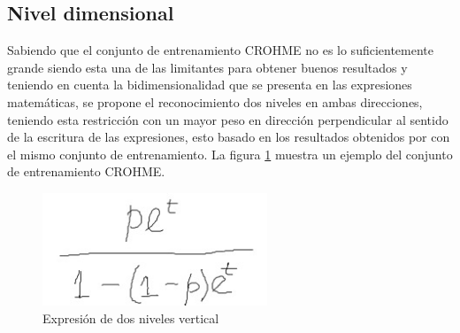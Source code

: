 \subsection{Nivel dimensional}
Sabiendo que el conjunto de entrenamiento CROHME no es lo suficientemente grande siendo esta una de las limitantes para obtener buenos resultados y teniendo en cuenta la bidimensionalidad que se presenta en las expresiones matemáticas, se propone el reconocimiento dos niveles en ambas direcciones, teniendo esta restricción con un mayor peso en dirección perpendicular al sentido de la escritura de las expresiones, esto basado en los resultados obtenidos por \cite{chino} 
con el mismo conjunto de entrenamiento. La figura \ref{fig:TwoDimensions} muestra un ejemplo del conjunto de entrenamiento CROHME.
\begin{figure}[H]
	\centering
	\includegraphics[width=0.6\textwidth]{capitulo3/imgs/twolevel.jpeg}
	\caption{Expresión de dos niveles vertical}
	\label{fig:TwoDimensions}
\end{figure}